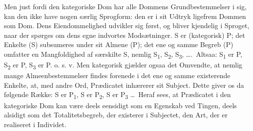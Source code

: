 \documentclass[12pt]{book}
\begin{document}
Men just fordi den kategoriske Dom har alle Dommens
Grundbestemmelser i sig, kan den ikke have nogen særlig Sprogform:
den er i sit Udtryk ligefrem Dommen som Dom.
Dens Eiendommelighed udvikler sig først, og bliver kjendelig i
Sproget, naar der spørges om dens egne indvortes Modsætninger.
S er (kategorisk) P; det Enkelte (S) subsumeres under
sit Almene (P); det ene og samme Begreb (P) omfatter en
Mangfoldighed af særskilte S, nemlig S\textsubscript{1}, S\textsubscript{2}, S\textsubscript{3}, \dots.\ Altsaa:
S\textsubscript{1} er P, S\textsubscript{2} er P, S\textsubscript{3} er P. o. s. v. Men kategorisk
gjælder ogsaa det Omvendte, at nemlig mange Almeenbestemmelser
findes forenede i det ene og samme existerende Enkelte,
at, med andre Ord, Prædicatet inhærerer sit Subject. Dette
giver os da følgende Række: S er P\textsubscript{1}, S er P\textsubscript{2}, S er P\textsubscript{3} \dots\
Heraf sees, at Prædicatet i den kategoriske Dom kan være
deels eensidigt som en Egenskab ved Tingen, deels alsidigt som
det Totalitetsbegreb, der existerer i Subjectet, den Art, der er
realiseret i Individet.
\end{document}
